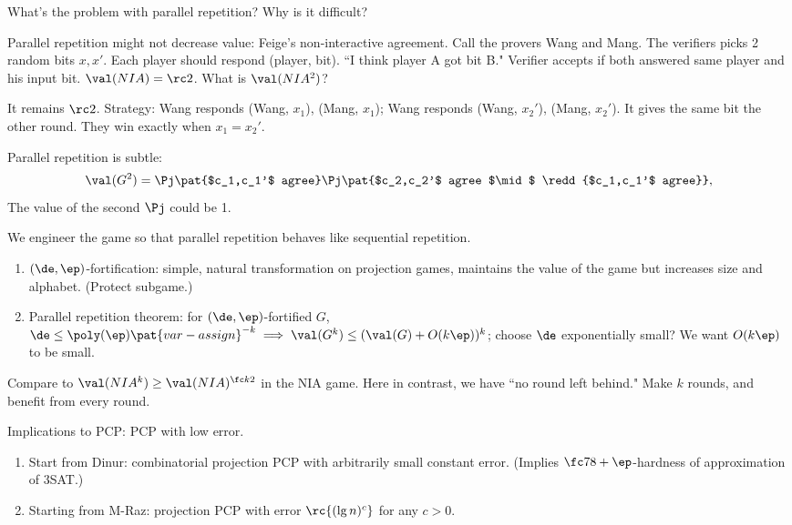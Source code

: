 What's the problem with parallel repetition? Why is it difficult?

Parallel repetition might not decrease value: Feige's non-interactive agreement. Call the provers Wang and Mang. The verifiers picks 2 random bits $x,x'$. Each player should respond (player, bit). ``I think player A got bit B." %
Verifier accepts if both answered same player and his input bit. $\val(NIA)=\rc2$. What is $\val(NIA^2)$?

It remains $\rc2$. Strategy: Wang responds (Wang, $x_1$), (Mang, $x_1$); Wang responds (Wang, $x_2'$), (Mang, $x_2'$). It gives the same bit the other round. They win exactly when $x_1=x_2'$. %

Parallel repetition is subtle:
\[
\val(G^2)=\Pj\pat{$c_1,c_1'$ agree}\Pj\pat{$c_2,c_2'$ agree $\mid$ \redd{$c_1,c_1'$ agree}},
\]
The value of the second $\Pj$ could be 1.

We engineer the game so that parallel repetition behaves like sequential repetition.
\begin{enumerate}
\item
$(\de,\ep)$-fortification: simple, natural transformation on projection games, maintains the value of the game but increases size and alphabet. (Protect subgame.)
\item
Parallel repetition theorem: for $(\de,\ep)$-fortified $G$, $\de\le \poly(\ep)\pat{var-assign}^{-k}\implies \val(G^k) \le (\val(G)+O(k\ep))^k$; choose $\de $ exponentially small?
We want $O(k\ep)$ to be small.
\end{enumerate}
Compare to $\val(NIA^k)\ge \val(NIA)^{\fc k2}$ in the NIA game. Here in contrast, we have ``no round left behind." Make $k$ rounds, and benefit from every round.

Implications to PCP: PCP with low error.
\begin{enumerate}
\item
Start from Dinur: combinatorial projection PCP with arbitrarily small constant error. (Implies $\fc 78+\ep$-hardness of approximation of 3SAT.)
\item Starting from M-Raz: projection PCP with error $\rc{(\lg n)^c}$ for any $c>0$.
\end{enumerate}

